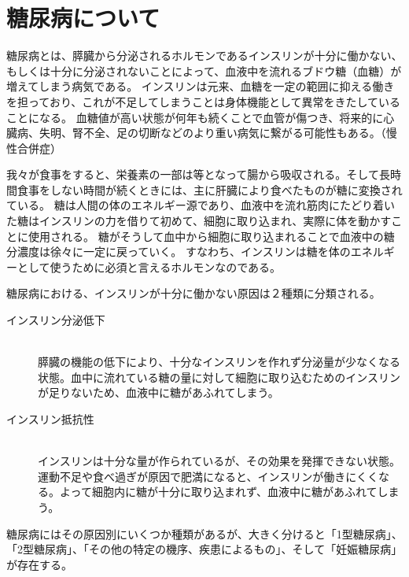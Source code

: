 
\chapter{糖尿病について}
\label{chap:diabetes}

糖尿病とは、膵臓から分泌されるホルモンであるインスリンが十分に働かない、もしくは十分に分泌されないことによって、血液中を流れるブドウ糖（血糖）が増えてしまう病気である。\cite{diabetes}
インスリンは元来、血糖を一定の範囲に抑える働きを担っており、これが不足してしまうことは身体機能として異常をきたしていることになる。
血糖値が高い状態が何年も続くことで血管が傷つき、将来的に心臓病、失明、腎不全、足の切断などのより重い病気に繋がる可能性もある。（慢性合併症）

我々が食事をすると、栄養素の一部は等となって腸から吸収される。そして長時間食事をしない時間が続くときには、主に肝臓により食べたものが糖に変換されている。
糖は人間の体のエネルギー源であり、血液中を流れ筋肉にたどり着いた糖はインスリンの力を借りて初めて、細胞に取り込まれ、実際に体を動かすことに使用される。
糖がそうして血中から細胞に取り込まれることで血液中の糖分濃度は徐々に一定に戻っていく。
すなわち、インスリンは糖を体のエネルギーとして使うために必須と言えるホルモンなのである。\cite{diabetes}

糖尿病における、インスリンが十分に働かない原因は２種類に分類される。\cite{diabetes}

\begin{description}
  \item [インスリン分泌低下]\mbox{}\\
    膵臓の機能の低下により、十分なインスリンを作れず分泌量が少なくなる状態。血中に流れている糖の量に対して細胞に取り込むためのインスリンが足りないため、血液中に糖があふれてしまう。
  \item [インスリン抵抗性]\mbox{}\\
    インスリンは十分な量が作られているが、その効果を発揮できない状態。運動不足や食べ過ぎが原因で肥満になると、インスリンが働きにくくなる。よって細胞内に糖が十分に取り込まれず、血液中に糖があふれてしまう。
\end{description}

糖尿病にはその原因別にいくつか種類があるが、大きく分けると「1型糖尿病」、「2型糖尿病」、「その他の特定の機序、疾患によるもの」、そして「妊娠糖尿病」が存在する。\cite{diabetes}

